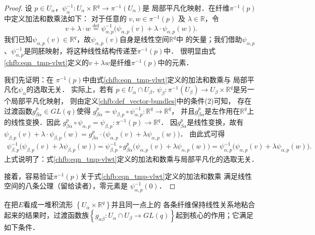 \begin{proof}
设 $p \in U_\alpha$，$\psi_\alpha^{-1}: U_\alpha \times \mathbb{R}^q \rightarrow \pi^{-1} (U_\alpha)$是
局部平凡化映射．在纤维$\pi^{-1}(p)$中定义加法和数乘法如下：
对于任意的 $v, w \in \pi^{-1}(p)$ 及 $\lambda \in \mathbb{R}$，令
\begin{equation}\label{chfb:eqn_tmp-vlwt}
    v+\lambda \cdot w \overset{\mathrm {def}}{=} \psi_{\alpha, p}^{-1} \bigl(\psi_{\alpha, p} (v)
    +\lambda \cdot \psi_{\alpha, p} (w)\bigr) .
\end{equation}
我们已知$\psi_{\alpha, p} (v)\in \mathbb{R}^q$，故$\psi_{\alpha, p} (v)$自身是线性空间$\mathbb{R}^q$中
的矢量；我们借助$\psi_{\alpha, p}$、$\psi_{\alpha, p}^{-1}$是同胚映射，将这种线性结构传递至$\pi^{-1}(p)$中．
很明显由式\eqref{chfb:eqn_tmp-vlwt}定义的$v+ \lambda w $是纤维$ \pi^{-1}(p)$中的元素．

我们先证明：在 $\pi^{-1}(p)$中由式\eqref{chfb:eqn_tmp-vlwt}定义的加法和数乘与
局部平凡化$\psi_\alpha$的选取无关．
实际上，若有 $p \in U_\alpha \cap U_\beta,\ \psi_\beta: \pi^{-1} (U_\beta )
 \rightarrow U_\beta \times \mathbb{R}^q $是另一个局部平凡化映射，
则由定义\ref{chfb:def_vector-bundles}中的条件(2)可知，
存在过渡函数$g_{\beta \alpha}^p \in GL(q)$使得
$g_{\beta \alpha}^p =\psi_{\beta, p} \circ \psi_{\alpha, p}^{-1}: \mathbb{R}^q \rightarrow \mathbb{R}^q $，
并且$g_{\beta \alpha}^p$是左作用在$\mathbb{R}^q$上的线性变换．因此
$g_{\beta \alpha}^p \circ \psi_{\alpha, p}=\psi_{\beta, p}: \pi^{-1}(p) \rightarrow \mathbb{R}^q $．
因$g_{\beta \alpha}^p$是线性变换，故有
$    \psi_{\beta, p}(v )+\lambda \cdot \psi_{\beta, p} (w)=
    g_{\beta \alpha}^p \cdot \bigl(\psi_{\alpha, p}(v)+ \lambda \psi_{\alpha, p} (w)\bigr) $．
由此式可得
\begin{align*}
    \psi_{\beta, p}^{-1} \bigl(\psi_{\beta, p} (v)+\lambda \psi_{\beta, p} (w)\bigr) 
    = \psi_{\beta, p}^{-1} \circ g_{\beta \alpha}^p \bigl(\psi_{\alpha, p}(v)+\lambda \psi_{\alpha, p}(w)\bigr)
    = \psi_{\alpha, p}^{-1} \bigl(\psi_{\alpha, p} (v)+\lambda \psi_{\alpha, p} (w)\bigr) .
\end{align*}  %
上式说明了：式\eqref{chfb:eqn_tmp-vlwt}定义的加法和数乘与局部平凡化的选取无关．

接着，容易验证$\pi^{-1}(p)$关于式\eqref{chfb:eqn_tmp-vlwt}定义的加法和数乘
满足线性空间的八条公理（留给读者），零元素是 $\psi_{\alpha, p}^{-1}(0)$．
\end{proof}

在把$E$看成一堆积流形 $\left\{U_\alpha \times \mathbb{R}^q\right\}$并且同一点上的
各条纤维保持线性关系地粘合起来的结果时，过渡函数族$\left\{g_{\alpha \beta}: U_\alpha \cap U_\beta 
\rightarrow GL(q)\right\}$起到核心的作用；它满足如下条件．


